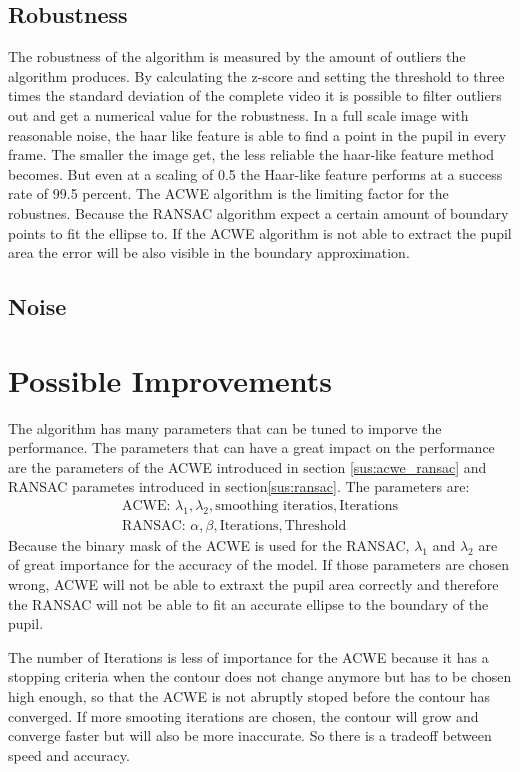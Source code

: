 \subsection{Robustness}
The robustness of the algorithm is measured by the amount of outliers the algorithm produces. By calculating the z-score and setting the threshold to three times the standard deviation of the complete video it is possible to filter outliers out and get a numerical value for the robustness. In a full scale image with reasonable noise, the haar like feature is able to find a point in the pupil in every frame. The smaller the image get, the less reliable the haar-like feature method becomes. But even at a scaling of 0.5 the Haar-like feature performs at a success rate of 99.5 percent. The ACWE algorithm is the limiting factor for the robustnes. Because the RANSAC algorithm expect a certain amount of boundary points to fit the ellipse to. If the ACWE algorithm is not able to extract the pupil area the error will be also visible in the boundary approximation. 
\subsection{Noise}

\section{Possible Improvements}
The algorithm has many parameters that can be tuned to imporve the performance. The parameters that can have a great impact on the performance are the parameters of the ACWE introduced in section \ref{sus:acwe_ransac} and RANSAC parametes introduced in section\ref{sus:ransac}. The parameters are:
\begin{gather*}
    \text{ACWE: } \lambda_1, \lambda_2,\text{smoothing iteratios}, \text{Iterations}\\
    \text{RANSAC: } \alpha, \beta, \text{Iterations}, \text{Threshold}
\end{gather*}
Because the binary mask of the ACWE is used for the RANSAC, $\lambda_1$ and $\lambda_2$ are of great importance for the accuracy of the model. If those parameters are chosen wrong, ACWE will not be able to extraxt the pupil area correctly and therefore the RANSAC will not be able to fit an accurate ellipse to the boundary of the pupil.

The number of Iterations is less of importance for the ACWE because it has a stopping criteria when the contour does not change anymore but has to be chosen high enough, so that the ACWE is not abruptly stoped before the contour has converged. If more smooting iterations are chosen, the contour will grow and converge faster but will also be more inaccurate. So there is a tradeoff between speed and accuracy. 

